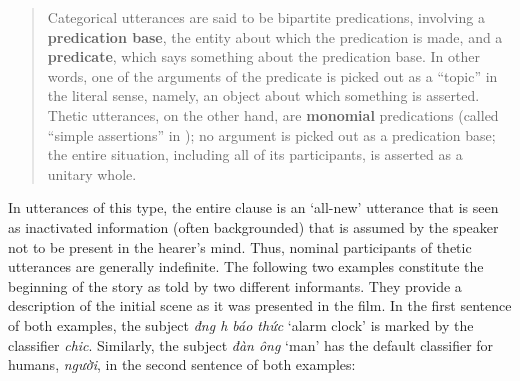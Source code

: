 \documentclass[output=paper]{langsci/langscibook}
\begin{document}
\begin{quote}
Categorical utterances are said to be bipartite predications, involving a {\textbf{predication base}}, the entity about which the predication is made, and a {\textbf{predicate}}, which says something about the predication base. In other words, one of the arguments of the predicate is picked out as a ``topic'' in the literal sense, namely, an object about which something is asserted. Thetic utterances, on the other hand, are {\textbf{monomial}} predications (called ``simple assertions'' in \citealt{sasse:87}); no argument is picked out as a predication base; the entire situation, including all of its participants, is asserted as a unitary whole. \citep[][4-5]{sasse:95}
\end{quote}

In utterances of this type, the entire clause is an `all-new' utterance that is seen as inactivated information (often backgrounded) that is assumed by the speaker not to be present in the hearer’s mind. Thus, nominal participants of thetic utterances are generally indefinite. The following two examples constitute the beginning of the story as told by two different informants. They provide a description of the initial scene as it was presented in the film. In the first sentence of both examples, the subject {\emph{đ{\daob}ng h{\daob} báo thức}} `alarm clock' is marked by the classifier {\emph{chi{\dae}c}}. Similarly, the subject {\emph{đàn ông}} `man' has the default classifier for humans, {\emph{người}}, in the second sentence of both examples:
\end{document}
